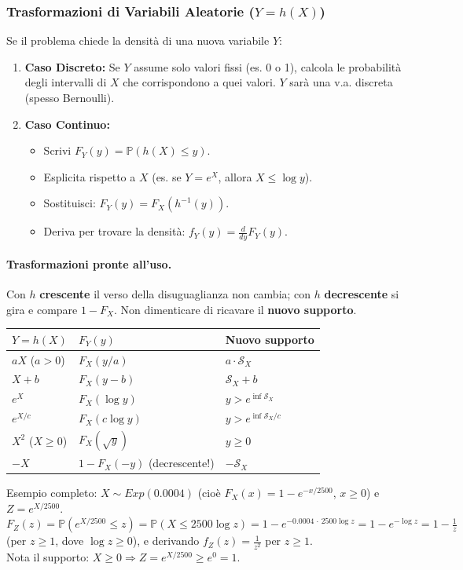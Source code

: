 \documentclass[12pt]{extarticle} %
\begin{document}
\subsubsection{Trasformazioni di Variabili Aleatorie ($Y = h(X)$)}
Se il problema chiede la densità di una nuova variabile $Y$:
\begin{enumerate}
    \item \textbf{Caso Discreto:} Se $Y$ assume solo valori fissi (es. 0 o 1), calcola le probabilità degli intervalli di $X$ che corrispondono a quei valori. $Y$ sarà una v.a. discreta (spesso Bernoulli).
    \item \textbf{Caso Continuo:} 
       \begin{itemize}
           \item Scrivi $F_Y(y) = \mathbb{P}(h(X) \le y)$.
           \item Esplicita rispetto a $X$ (es. se $Y=e^X$, allora $X \le \log y$).
           \item Sostituisci: $F_Y(y) = F_X(h^{-1}(y))$.
           \item Deriva per trovare la densità: $f_Y(y) = \frac{d}{dy} F_Y(y)$.
       \end{itemize}
\end{enumerate}

\paragraph{Trasformazioni pronte all'uso.} Con $h$ \textbf{crescente} il verso della disuguaglianza non cambia; con $h$ \textbf{decrescente} si gira e compare $1 - F_X$. Non dimenticare di ricavare il \textbf{nuovo supporto}.
\begin{center}
\renewcommand{\arraystretch}{1.7}
\begin{tabular}{|l|l|l|}
\hline
$Y = h(X)$ & $F_Y(y)$ & Nuovo supporto \\ \hline
$aX$ \; ($a>0$) & $F_X(y/a)$ & $a \cdot \mathcal{S}_X$ \\ \hline
$X + b$ & $F_X(y - b)$ & $\mathcal{S}_X + b$ \\ \hline
$e^{X}$ & $F_X(\log y)$ & $y > e^{\inf \mathcal{S}_X}$ \\ \hline
$e^{X/c}$ & $F_X(c\log y)$ & $y > e^{\inf \mathcal{S}_X / c}$ \\ \hline
$X^2$ \; ($X \ge 0$) & $F_X(\sqrt y)$ & $y \ge 0$ \\ \hline
$-X$ & $1 - F_X(-y)$ \; {\footnotesize (decrescente!)} & $-\mathcal{S}_X$ \\ \hline
\end{tabular}
\end{center}
{\footnotesize Esempio completo: $X \sim Exp(0.0004)$ (cioè $F_X(x) = 1-e^{-x/2500}$, $x\ge0$) e $Z = e^{X/2500}$. \\
$F_Z(z) = \mathbb{P}(e^{X/2500} \le z) = \mathbb{P}(X \le 2500\log z) = 1 - e^{-0.0004 \,\cdot\, 2500 \log z} = 1 - e^{-\log z} = 1 - \frac{1}{z}$ (per $z \ge 1$, dove $\log z \ge 0$), e derivando $f_Z(z) = \frac{1}{z^2}$ per $z \ge 1$. \\
Nota il supporto: $X \ge 0 \Rightarrow Z = e^{X/2500} \ge e^0 = 1$.}
\end{document}
